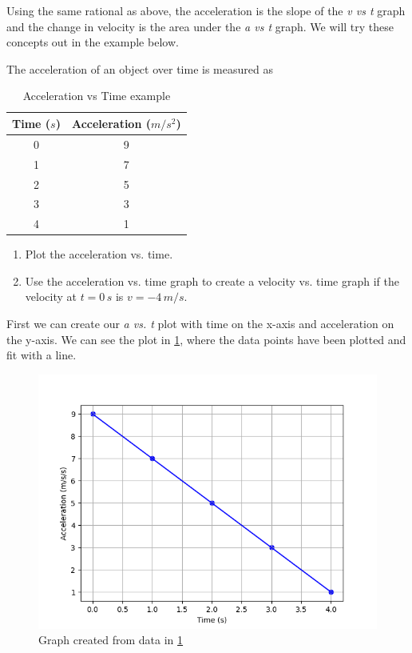 \documentclass[12pt]{book}
\begin{document}
Using the same rational as above, the acceleration is the slope of the \textit{v vs t} graph and the change in velocity is the area under the \textit{a vs t} graph. We will try these concepts out in the example below.

\linespace

\example

The acceleration of an object over time is measured as

\begin{table}[h]
\large
\centering
\caption{Acceleration vs Time example}
\begin{tabular}{| c | c |}
	\hline
	Time ($s$) & Acceleration ($m/s^2$) \\
	\hline
	0 & 9 \\ \hline
	1 & 7 \\ \hline
	2 & 5 \\ \hline
	3 & 3 \\ \hline
	4 & 1 \\ 
	\hline
\end{tabular}
\label{atable_ex1}
\end{table}

\begin{enumerate}
\item Plot the acceleration vs. time.
\item Use the acceleration vs. time graph to create a velocity vs. time graph if the velocity at $t = 0 \, s$ is $v = -4 \, m/s$.
\end{enumerate}

First we can create our \textit{a vs. t} plot with time on the x-axis and acceleration on the y-axis. We can see the plot in \ref{atable_motiongraph_ex1}, where the data points have been plotted and fit with a line.

\begin{figure}[h]
\centering
\includegraphics[scale=0.6]{example_accel.png}
\caption{Graph created from data in \ref{atable_ex1}}
\label{atable_motiongraph_ex1}
\end{figure}
\end{document}
